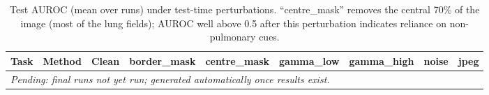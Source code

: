 \begin{table}[t]
\centering
\scriptsize
\caption{Test AUROC (mean over runs) under test-time perturbations. ``centre\_mask'' removes the central 70\% of the image (most of the lung fields); AUROC well above 0.5 after this perturbation indicates reliance on non-pulmonary cues.}
\label{tab:robustness}
\begin{tabular}{clccccccc}
\toprule
Task & Method & Clean & border\_mask & centre\_mask & gamma\_low & gamma\_high & noise & jpeg\\
\midrule
\multicolumn{9}{l}{\textit{Pending: final runs not yet run; generated automatically once results exist.}}\\
\bottomrule
\end{tabular}
\end{table}
